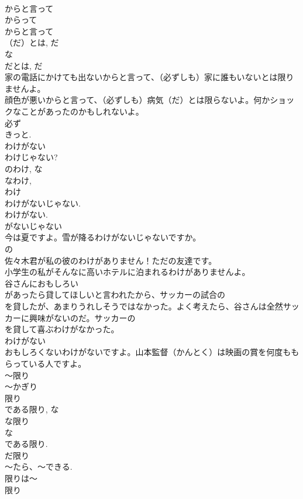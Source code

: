 \documentclass[8pt]{extreport}
\begin{document}
\begin{CJK}{UTF8}{min}
\\	からと言って 
\\	からって 
\\	からと言って
\\	（だ）とは, だ 
\\	な
\\	だとは, だ 
\\	家の電話にかけても出ないからと言って、（必ずしも）家に誰もいないとは限りませんよ。
\\	顔色が悪いからと言って、（必ずしも）病気（だ）とは限らないよ。何かショックなことがあったのかもしれないよ。
\\	必ず 
\\	きっと.
\\	わけがない
\\	わけじゃない?
\\	のわけ, な
\\	なわけ, 
\\	わけ
\\	わけがないじゃない. 
\\	わけがない. 
\\	がないじゃない 
\\	今は夏ですよ。雪が降るわけがないじゃないですか。
\\	の 
\\	佐々木君が私の彼のわけがありません！ただの友達です。
\\	小学生の私がそんなに高いホテルに泊まれるわけがありませんよ。
\\	谷さんにおもしろい
\\	があったら貸してほしいと言われたから、サッカーの試合の
\\	を貸したが、あまりうれしそうではなかった。よく考えたら、谷さんは全然サッカーに興味がないのだ。サッカーの
\\	を貸して喜ぶわけがなかった。
\\	わけがない 
\\	おもしろくないわけがないですよ。山本監督（かんとく）は映画の賞を何度ももらっている人ですよ。
\\	～限り
\\	～かぎり
\\	限り 
\\	である限り, な
\\	な限り 
\\	な
\\	である限り. 
\\	だ限り
\\	～たら、～できる.
\\	限りは～ 
\\	限り

\end{CJK}
\end{document}
